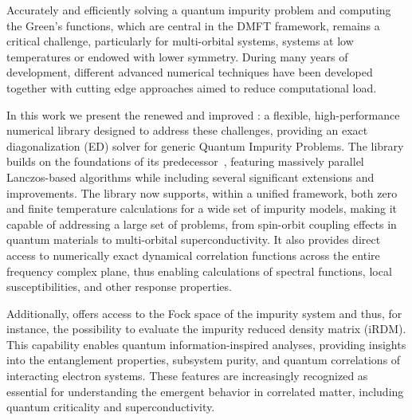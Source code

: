 \documentclass[edipack_sp.tex]{subfiles}
\begin{document}
Accurately and efficiently solving a quantum impurity problem and computing the Green's functions, which are central in the DMFT framework, remains a
critical challenge, particularly for multi-orbital systems, systems
at low temperatures or endowed with lower symmetry. During many years of development, different advanced numerical techniques have been developed together with cutting edge approaches aimed to reduce computational load. 

In this work we present the renewed and improved \NAME{}: a flexible, high-performance numerical library designed to address these challenges, providing an exact diagonalization (ED) solver for generic Quantum Impurity Problems. 
The library builds on the foundations of
its predecessor~\cite{Amaricci2022CPC}, featuring massively parallel Lanczos-based algorithms while including several significant extensions and improvements. The library now supports, within a unified framework, both zero and finite temperature calculations for a wide set of impurity models, making it capable of addressing a large set of problems, from spin-orbit coupling effects in quantum materials to multi-orbital superconductivity. It also provides direct
access to numerically exact
dynamical correlation functions across the
entire frequency complex plane, thus enabling calculations of spectral functions, local susceptibilities, and other response properties.

Additionally, \NAME offers access to the Fock space of
the impurity system and thus, for instance, the possibility to evaluate the impurity reduced density matrix
(iRDM). This capability enables quantum information-inspired analyses, providing insights into the entanglement properties, subsystem purity, and quantum correlations of interacting electron systems. These
features are increasingly recognized as essential for understanding the emergent behavior in correlated matter, including quantum criticality and superconductivity.
\end{document}
